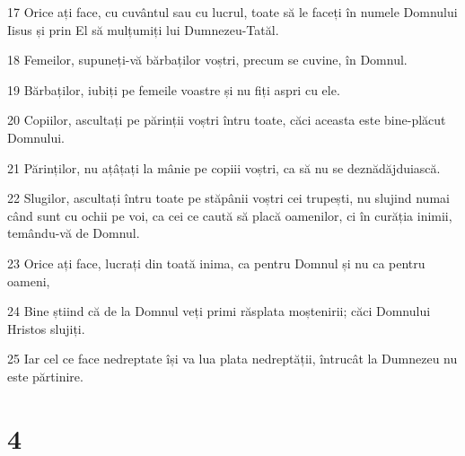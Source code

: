 \par 17 Orice ați face, cu cuvântul sau cu lucrul, toate să le faceți în numele Domnului Iisus și prin El să mulțumiți lui Dumnezeu-Tatăl.
\par 18 Femeilor, supuneți-vă bărbaților voștri, precum se cuvine, în Domnul.
\par 19 Bărbaților, iubiți pe femeile voastre și nu fiți aspri cu ele.
\par 20 Copiilor, ascultați pe părinții voștri întru toate, căci aceasta este bine-plăcut Domnului.
\par 21 Părinților, nu ațâțați la mânie pe copiii voștri, ca să nu se deznădăjduiască.
\par 22 Slugilor, ascultați întru toate pe stăpânii voștri cei trupești, nu slujind numai când sunt cu ochii pe voi, ca cei ce caută să placă oamenilor, ci în curăția inimii, temându-vă de Domnul.
\par 23 Orice ați face, lucrați din toată inima, ca pentru Domnul și nu ca pentru oameni,
\par 24 Bine știind că de la Domnul veți primi răsplata moștenirii; căci Domnului Hristos slujiți.
\par 25 Iar cel ce face nedreptate își va lua plata nedreptății, întrucât la Dumnezeu nu este părtinire.

\chapter{4}

